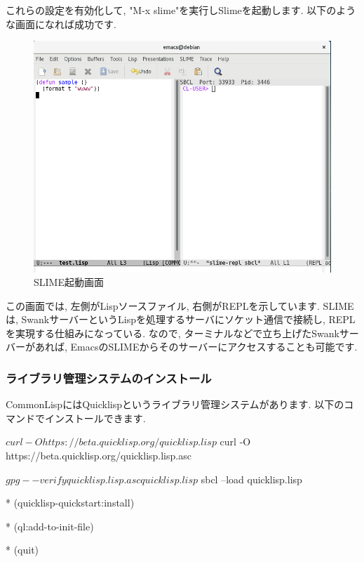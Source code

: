 \documentclass[mingoth,a4paper]{jsarticle}
\begin{document}
これらの設定を有効化して, "M-x slime"を実行しSlimeを起動します. 以下のような画面になれば成功です. 

\begin{figure}[htbp!]
\centering
\includegraphics[width=\linewidth]{image201709-kansai/run-slime.png}
\caption{SLIME起動画面}
\end{figure}

この画面では, 左側がLispソースファイル, 右側がREPLを示しています. 
SLIMEは, SwankサーバーというLispを処理するサーバにソケット通信で接続し, REPLを実現する仕組みになっている. なので, ターミナルなどで立ち上げたSwankサーバーがあれば, EmacsのSLIMEからそのサーバーにアクセスすることも可能です. 

\subsubsection{ライブラリ管理システムのインストール}

CommonLispにはQuicklispというライブラリ管理システムがあります. 以下のコマンドでインストールできます. 

\begin{commandline}
$ curl -O https://beta.quicklisp.org/quicklisp.lisp

$ curl -O https://beta.quicklisp.org/quicklisp.lisp.asc

$ gpg --verify quicklisp.lisp.asc quicklisp.lisp

$ sbcl --load quicklisp.lisp

* (quicklisp-quickstart:install)

* (ql:add-to-init-file)

* (quit)
\end{commandline}
\end{document}
